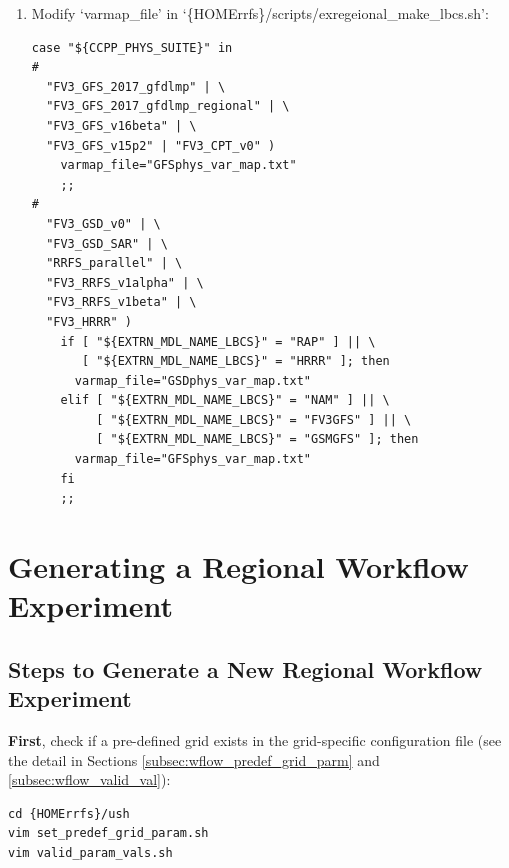 \documentclass[11pt,fleqn]{report}              %
\begin{document}
\begin{enumerate}
\item Modify `varmap\_file' in `\{HOMErrfs\}/scripts/exregeional\_make\_lbcs.sh':
\lstset{language=bash}   
\begin{lstlisting}[frame=trBL,basicstyle=\scriptsize]
case "${CCPP_PHYS_SUITE}" in
#
  "FV3_GFS_2017_gfdlmp" | \
  "FV3_GFS_2017_gfdlmp_regional" | \
  "FV3_GFS_v16beta" | \
  "FV3_GFS_v15p2" | "FV3_CPT_v0" )
    varmap_file="GFSphys_var_map.txt"
    ;;
#
  "FV3_GSD_v0" | \
  "FV3_GSD_SAR" | \
  "RRFS_parallel" | \
  "FV3_RRFS_v1alpha" | \
  "FV3_RRFS_v1beta" | \
  "FV3_HRRR" )
    if [ "${EXTRN_MDL_NAME_LBCS}" = "RAP" ] || \
       [ "${EXTRN_MDL_NAME_LBCS}" = "HRRR" ]; then
      varmap_file="GSDphys_var_map.txt"
    elif [ "${EXTRN_MDL_NAME_LBCS}" = "NAM" ] || \
         [ "${EXTRN_MDL_NAME_LBCS}" = "FV3GFS" ] || \
         [ "${EXTRN_MDL_NAME_LBCS}" = "GSMGFS" ]; then
      varmap_file="GFSphys_var_map.txt"
    fi
    ;;
\end{lstlisting}


\end{enumerate}



\section{Generating a Regional Workflow Experiment}
\label{sec:workflow_newreg}

\subsection{Steps to Generate a New Regional Workflow Experiment}
\label{subsec:wflow_flowchart}

{\bf First}, check if a pre-defined grid exists in the grid-specific configuration file (see the detail in Sections \ref{subsec:wflow_predef_grid_parm} and \ref{subsec:wflow_valid_val}):
\lstset{language=bash}   
\begin{lstlisting}[frame=trBL]
cd {HOMErrfs}/ush
vim set_predef_grid_param.sh
vim valid_param_vals.sh
\end{lstlisting}

\vspace{0.5cm}
\end{document}
